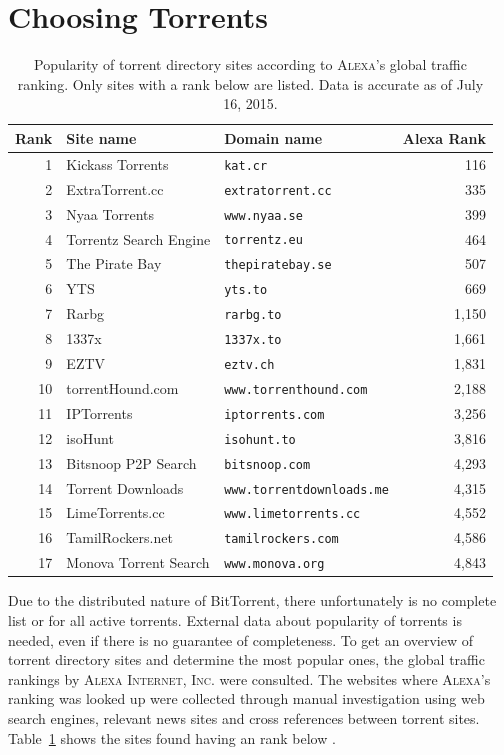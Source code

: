 \documentclass[10pt, a4paper, twoside, headsepline]{scrbook}
\renewcommand{\_}{\origunderscore\allowbreak}
\begin{document}
\section{Choosing Torrents}
\label{cho}
\begin{table}
\centering
\begin{tabular}{rllr}
\toprule
Rank & Site name & Domain name & Alexa Rank \\
\midrule
1 & Kickass Torrents & \texttt{kat.cr} & 116 \\
2 & ExtraTorrent.cc & \texttt{extratorrent.cc} & 335 \\
3 & Nyaa Torrents & \texttt{www.nyaa.se} & 399 \\
4 & Torrentz Search Engine & \texttt{torrentz.eu} & 464 \\
5 & The Pirate Bay & \texttt{thepiratebay.se} & 507 \\
6 & YTS & \texttt{yts.to} & 669 \\
7 & Rarbg & \texttt{rarbg.to} & 1,150 \\
8 & 1337x & \texttt{1337x.to} & 1,661 \\
9 & EZTV & \texttt{eztv.ch} & 1,831 \\
10 & torrentHound.com & \texttt{www.torrenthound.com} & 2,188 \\
11 & IPTorrents & \texttt{iptorrents.com} & 3,256 \\
12 & isoHunt & \texttt{isohunt.to} & 3,816 \\
13 & Bitsnoop P2P Search & \texttt{bitsnoop.com} & 4,293 \\
14 & Torrent Downloads & \texttt{www.torrentdownloads.me} & 4,315 \\
15 & LimeTorrents.cc & \texttt{www.limetorrents.cc} & 4,552 \\
16 & TamilRockers.net & \texttt{tamilrockers.com} & 4,586 \\
17 & Monova Torrent Search & \texttt{www.monova.org} & 4,843 \\
\bottomrule
\end{tabular}
\caption[Popular torrent directory sites according to \textsc{Alexa}]{Popularity of torrent directory sites according to \textsc{Alexa}'s \cite{alexa} global traffic ranking. Only sites with a rank below  are listed. Data is accurate as of July 16, 2015.}
\label{torrentsites}
\end{table}

Due to the distributed nature of BitTorrent, there unfortunately is no complete list or for all active torrents. External data about popularity of torrents is needed, even if there is no guarantee of completeness. To get an overview of torrent directory sites and determine the most popular ones, the global traffic rankings by \textsc{Alexa Internet, Inc.} \cite{alexa} were consulted. The websites where \textsc{Alexa}'s ranking was looked up were collected through manual investigation using web search engines, relevant news sites and cross references between torrent sites. Table~\ref{torrentsites} shows the  sites found having an rank below .
\end{document}
